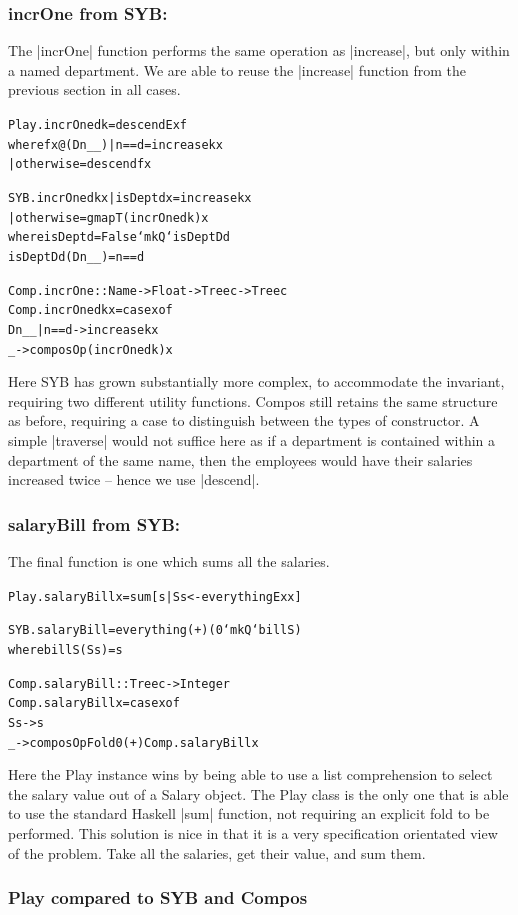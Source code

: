 \documentclass[preprint]{sigplanconf}
\newenvironment{code}{\begin{alltt}\small}{\end{alltt}}
\newcommand{\compare}[2]{\subsubsection*{\textsf{#1} from #2:}\vspace{-1ex}}
\begin{document}
\compare{incrOne}{SYB}

The |incrOne| function performs the same operation as |increase|, but only within a named department. We are able to reuse the |increase| function from the previous section in all cases.

\begin{code}
Play.incrOne d k = descendEx f
    where f x@(D n _ _)  | n == d     = increase k x
                         | otherwise  = descend f x

SYB.incrOne d k x  | isDept d x  = increase k x
                   | otherwise   = gmapT (incrOne d k) x
    where  isDept   d = False `mkQ` isDeptD d
           isDeptD  d (D n _ _) = n == d

Comp.incrOne :: Name -> Float -> Tree c -> Tree c
Comp.incrOne d k x = case x of
    D n _ _ | n == d -> increase k x
    _ -> composOp (incrOne d k) x
\end{code}

Here SYB has grown substantially more complex, to accommodate the invariant, requiring two different utility functions. Compos still retains the same structure as before, requiring a case to distinguish between the types of constructor. A simple |traverse| would not suffice here as if a department is contained within a department of the same name, then the employees would have their salaries increased twice -- hence we use |descend|.

\compare{salaryBill}{SYB}

The final function is one which sums all the salaries.

\begin{code}
Play.salaryBill x = sum [s | S s <- everythingEx x]

SYB.salaryBill = everything (+) (0 `mkQ` billS)
   where billS (S s) = s

Comp.salaryBill :: Tree c -> Integer
Comp.salaryBill x = case x of
    S s -> s
    _ -> composOpFold 0 (+) Comp.salaryBill x
\end{code}

Here the Play instance wins by being able to use a list comprehension to select the salary value out of a Salary object. The Play class is the only one that is able to use the standard Haskell |sum| function, not requiring an explicit fold to be performed. This solution is nice in that it is a very specification orientated view of the problem. Take all the salaries, get their value, and sum them.

\subsubsection{Play compared to SYB and Compos}
\end{document}
